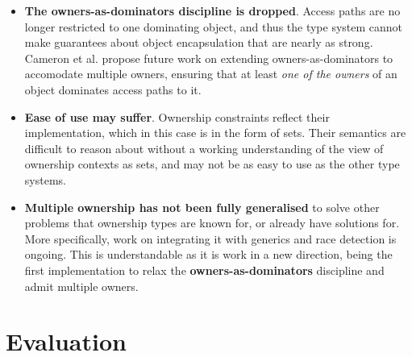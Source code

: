 \documentclass{acm_proc_article-sp}
\begin{document}
\begin{itemize}

	\item \textbf{The owners-as-dominators discipline is dropped}. Access paths
		are no longer restricted to one dominating object, and thus the type
		system cannot make guarantees about object encapsulation that are nearly
		as strong. Cameron et al. propose future work on extending
		owners-as-dominators to accomodate multiple owners, ensuring that at
		least \textit{one of the owners} of an object dominates access paths to
		it.

    \item \textbf{Ease of use may suffer}. Ownership constraints reflect their
        implementation, which in this case is in the form of sets. Their
        semantics are difficult to reason about without a working understanding
        of the view of ownership contexts as sets, and may not be as easy to use
        as the other type systems.

	\item \textbf{Multiple ownership has not been fully generalised} to solve
		other problems that ownership types are known for, or already have
		solutions for. More specifically, work on integrating it with generics
		and race detection is ongoing. This is understandable as it is work in
		a new direction, being the first implementation to relax the
		\textbf{owners-as-dominators} discipline and admit multiple owners.

\end{itemize}

\section{Evaluation}
\label{sec:eval}
\end{document}
